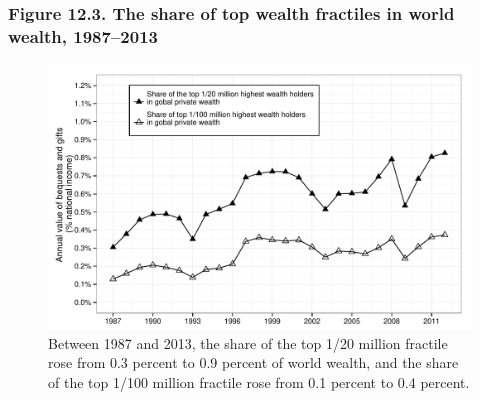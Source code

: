 \documentclass[t]{beamer}\usepackage[]{graphicx}\usepackage[]{color}
\newenvironment{knitrout}{}{} %
\begin{document}
\begin{frame}[label=Figure_12_3]
\frametitle{Figure 12.3. The share of top wealth fractiles in world wealth, 1987--2013}
\begin{figure}[t]
\begin{minipage}[b]{\textwidth}
\centering
\begin{knitrout}\footnotesize
{}\color{fgcolor}

{\centering \includegraphics[width=1\linewidth]{figures/bw/Figure_12_3} 

}



\end{knitrout}
\caption{Between 1987 and 2013, the share of the top 1/20 million fractile rose from 0.3 percent to 0.9 percent of world wealth, and the share of the top 1/100 million fractile rose from 0.1 percent to 0.4 percent.}
\end{minipage}
\end{figure}
\end{frame}
\end{document}
